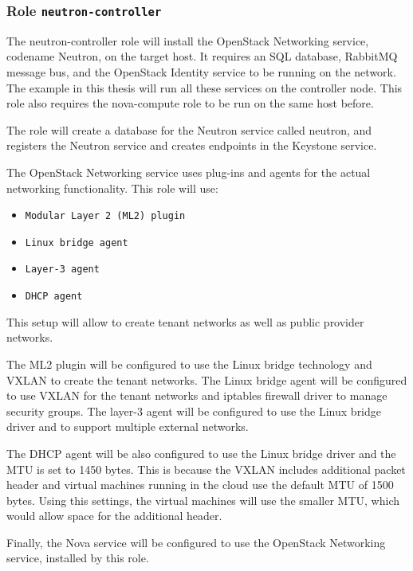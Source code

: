 \subsubsection*{Role \texttt{neutron-controller}}
The neutron-controller role will install the OpenStack Networking service, codename Neutron, on the target host. It requires an SQL database, RabbitMQ message bus, and the OpenStack Identity service to be running on the network. The example in this thesis will run all these services on the controller node. This role also requires the nova-compute role to be run on the same host before.

The role will create a database for the Neutron service called neutron, and registers the Neutron service and creates endpoints in the Keystone service.

The OpenStack Networking service uses plug-ins and agents for the actual networking functionality. This role will use:
\begin{itemize}
  \item{\texttt{Modular Layer 2 (ML2) plugin}}
  \item{\texttt{Linux bridge agent}}
  \item{\texttt{Layer-3 agent}}
  \item{\texttt{DHCP agent}}
\end{itemize}
This setup will allow to create tenant networks as well as public provider networks.

The ML2 plugin will be configured to use the Linux bridge technology and VXLAN to create the tenant networks. The Linux bridge agent will be configured to use VXLAN for the tenant networks and iptables firewall driver to manage security groups. The layer-3 agent will be configured to use the Linux bridge driver and to support multiple external networks.

The DHCP agent will be also configured to use the Linux bridge driver and the MTU is set to 1450 bytes. This is because the VXLAN includes additional packet header and virtual machines running in the cloud use the default MTU of 1500 bytes. Using this settings, the virtual machines will use the smaller MTU, which would allow space for the additional header.

Finally, the Nova service will be configured to use the OpenStack Networking service, installed by this role.

